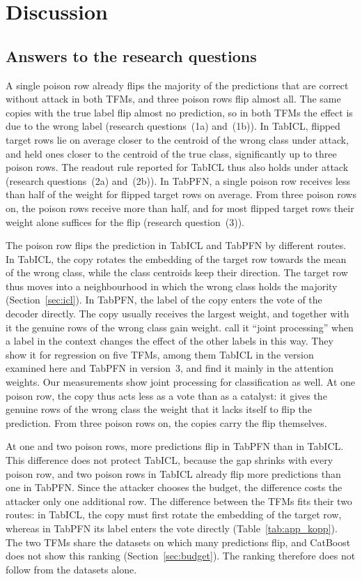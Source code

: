 \documentclass[pdflatex,sn-mathphys-num]{sn-jnl}
\begin{document}
\section{Discussion}
\label{sec:diskussion}

\subsection{Answers to the research questions}
\label{sec:antworten}

A single poison row already flips the majority of the predictions that
are correct without attack in both TFMs, and three poison rows flip
almost all. The same copies with the true label flip almost no
prediction, so in both TFMs the effect is due to the wrong label
(research questions~(1a) and~(1b)). In TabICL, flipped target rows lie
on average closer to the centroid of the wrong class under attack, and
held ones closer to the centroid of the true class, significantly up to
three poison rows. The readout rule reported for TabICL thus also holds
under attack (research questions~(2a) and~(2b)). In TabPFN, a single
poison row receives less than half of the weight for flipped target rows
on average. From three poison rows on, the poison rows receive more than
half, and for most flipped target rows their weight alone suffices for
the flip (research question~(3)).

The poison row flips the prediction in TabICL and TabPFN by different
routes. In TabICL, the
copy rotates the embedding of the target row towards the mean of the
wrong class, while the class centroids keep their direction. The target
row thus moves into a neighbourhood in which the wrong class holds the
majority (Section~\ref{sec:icl}). In TabPFN, the label of the copy enters
the vote of the decoder directly. The copy usually receives the largest
weight, and together with it the genuine rows of the wrong class gain
weight. \citet{nguyen2026} call it \enquote{joint processing} when a
label in the context changes the effect of the other labels in this way.
They show it for regression on five TFMs, among them TabICL in the
version examined here and TabPFN in version~3, and find it mainly in the
attention weights. Our measurements show joint processing for
classification as well. At one poison row, the copy thus acts less as a
vote than as a catalyst: it gives the genuine rows of the wrong class the
weight that it lacks itself to flip the prediction. From three poison
rows on, the copies carry the flip themselves.

At one and two poison rows, more predictions flip in TabPFN than in
TabICL. This difference does not protect TabICL, because the gap shrinks
with every poison row, and two poison rows in TabICL already flip more
predictions than one in TabPFN. Since the attacker chooses the budget,
the difference costs the attacker only one additional row. The
difference between the TFMs fits their two routes: in
TabICL, the copy must first rotate the embedding of the target row,
whereas in TabPFN its label enters the vote directly
(Table~\ref{tab:app_kopp}). The two TFMs share the datasets on which many
predictions flip, and CatBoost does not show this ranking
(Section~\ref{sec:budget}). The ranking therefore does not follow from
the datasets alone.
\end{document}
